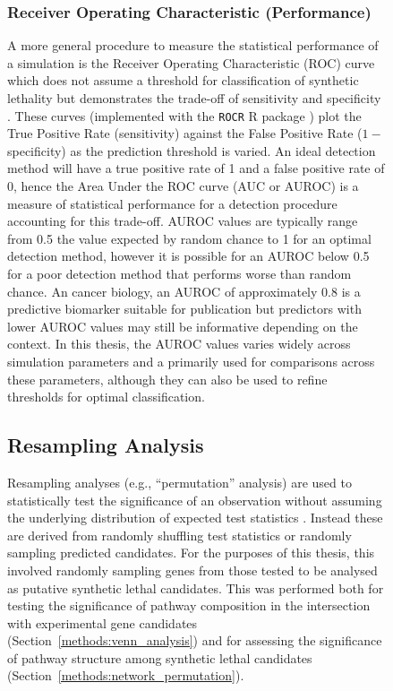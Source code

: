 \begin{figure}[!htp]
\subsubsection{Receiver Operating Characteristic (Performance)}
A more general procedure to measure the statistical performance of a simulation is the Receiver Operating Characteristic (ROC) curve which does not assume a threshold for classification of synthetic lethality but demonstrates the trade-off of sensitivity and specificity \citep{Zweig1993, Fawcett2006, Akobeng2007}. These curves (implemented with the \texttt{ROCR} R package \citep{ROCR}) plot the True Positive Rate (sensitivity) against the False Positive Rate ($1-$specificity) as the prediction threshold is varied. An ideal detection method will have a true positive rate of 1 and a false positive rate of 0, hence the Area Under the ROC curve (AUC or AUROC) is a measure of statistical performance for a detection procedure accounting for this trade-off. AUROC values are typically range from 0.5 the value expected by random chance to 1 for an optimal detection method, however it is possible for an AUROC below 0.5 for a poor detection method that performs worse than random chance. An cancer biology, an AUROC of approximately $0.8$ is a predictive biomarker suitable for publication \citep{Hajian-Tilaki2013} but predictors with lower AUROC values may still be informative depending on the context. In this thesis, the AUROC values varies widely across simulation parameters and a primarily used for comparisons across these parameters, although they can also be used to refine thresholds for optimal classification. 

\subsection{Resampling Analysis} \label{methods:permutation}
Resampling analyses (e.g., ``permutation'' analysis) are used to statistically test the significance of an observation without assuming the underlying distribution of expected test statistics \citet{Collingridge2013}. Instead these are derived from randomly shuffling test statistics or randomly sampling predicted candidates. For the purposes of this thesis, this involved randomly sampling genes from those tested to be analysed as putative synthetic lethal candidates. This was performed both for testing the significance of pathway composition in the intersection with experimental gene candidates (Section~\ref{methods:venn_analysis}) and for assessing the significance of pathway structure among synthetic lethal candidates (Section~\ref{methods:network_permutation}).


\end{figure}
